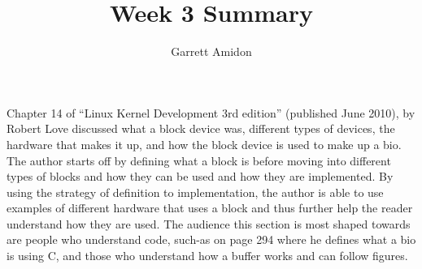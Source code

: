 \documentclass[a4paper]{article}
\title{Week 3 Summary}
\author{Garrett Amidon}
\begin{document}
\maketitle




\paragraph{}

Chapter 14 of “Linux Kernel Development 3rd edition” (published June 2010), by Robert Love discussed what a block device was, different types of devices, the hardware that makes it up, and how the block device is used to make up a bio. The author starts off by defining what a block is before moving into different types of blocks and how they can be used and how they are implemented. By using the strategy of definition to implementation, the author is able to use examples of different hardware that uses a block and thus further help the reader understand how they are used. The audience this section is most shaped towards are people who understand code, such-as on page 294 where he defines what a bio is using C, and those who understand how a buffer works and can follow figures. 
\end{document}
